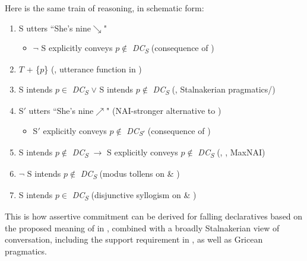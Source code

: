 \documentclass[output=paper,colorlinks,citecolor=brown]{langscibook}
\begin{document}
	Here is the same train of reasoning, in schematic form:
	
	\begin{enumerate}
		

		
		\item S utters ``She's nine$\searrow$"  \label{utt}\hfill {}
		\begin{itemize}
			\item $\neg$ S explicitly conveys $p \not\in$ \emph{DC\textsubscript{S}} \hfill (consequence of  )
		\end{itemize}
		
		
		\item $T$ + \{$p$\} \hfill (, utterance function in )\label{uttT}
		
		
		\item S intends $p \in$ \emph{DC\textsubscript{S}} $\vee$ S intends $p \not\in$ \emph{DC\textsubscript{S}} \hfill (, Stalnakerian pragmatics/)\label{taut}
		
		\item S$'$ utters ``She's nine$\nearrow$"  \label{ex:13:alt} \hfill (NAI-stronger alternative to )
		\begin{itemize}
			\item S$'$ explicitly conveys $p \not\in$ \emph{DC\textsubscript{S$'$}} \hfill (consequence of )
		\end{itemize}
		
		
		\item S intends $p \not\in$ \emph{DC\textsubscript{S}} $\rightarrow$ S explicitly conveys $p \not\in$ \emph{DC\textsubscript{S}} \hfill (, , MaxNAI)\label{Quant}
		
		\item $\neg$ S intends $p \not\in$ \emph{DC\textsubscript{S}} \hfill (modus tollens on  \& )\label{notIntend}
		
		\item S intends $p \in$ \emph{DC\textsubscript{S}} \hfill (disjunctive syllogism on  \& )
		
	\end{enumerate}
	
	\noindent This is how assertive commitment can be derived for falling declaratives based on the proposed meaning of \rise in , combined with a broadly Stalnakerian view of conversation, including the support requirement in , as well as Gricean pragmatics.
	
\end{document}
